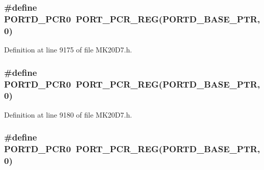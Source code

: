 \subsubsection[{\texorpdfstring{P\+O\+R\+T\+D\+\_\+\+P\+C\+R0}{PORTD_PCR0}}]{\setlength{\rightskip}{0pt plus 5cm}\#define P\+O\+R\+T\+D\+\_\+\+P\+C\+R0~{\bf P\+O\+R\+T\+\_\+\+P\+C\+R\+\_\+\+R\+EG}({\bf P\+O\+R\+T\+D\+\_\+\+B\+A\+S\+E\+\_\+\+P\+TR},0)}\hypertarget{group___p_o_r_t___register___accessor___macros_ga9e25f8f3bd921a0a05ea3ee7a0bf3678}{}\label{group___p_o_r_t___register___accessor___macros_ga9e25f8f3bd921a0a05ea3ee7a0bf3678}


Definition at line 9175 of file M\+K20\+D7.\+h.

\subsubsection[{\texorpdfstring{P\+O\+R\+T\+D\+\_\+\+P\+C\+R0}{PORTD_PCR0}}]{\setlength{\rightskip}{0pt plus 5cm}\#define P\+O\+R\+T\+D\+\_\+\+P\+C\+R0~{\bf P\+O\+R\+T\+\_\+\+P\+C\+R\+\_\+\+R\+EG}({\bf P\+O\+R\+T\+D\+\_\+\+B\+A\+S\+E\+\_\+\+P\+TR},0)}\hypertarget{group___p_o_r_t___register___accessor___macros_ga9e25f8f3bd921a0a05ea3ee7a0bf3678}{}\label{group___p_o_r_t___register___accessor___macros_ga9e25f8f3bd921a0a05ea3ee7a0bf3678}


Definition at line 9180 of file M\+K20\+D7.\+h.

\subsubsection[{\texorpdfstring{P\+O\+R\+T\+D\+\_\+\+P\+C\+R0}{PORTD_PCR0}}]{\setlength{\rightskip}{0pt plus 5cm}\#define P\+O\+R\+T\+D\+\_\+\+P\+C\+R0~{\bf P\+O\+R\+T\+\_\+\+P\+C\+R\+\_\+\+R\+EG}({\bf P\+O\+R\+T\+D\+\_\+\+B\+A\+S\+E\+\_\+\+P\+TR},0)}\hypertarget{group___p_o_r_t___register___accessor___macros_ga9e25f8f3bd921a0a05ea3ee7a0bf3678}{}\label{group___p_o_r_t___register___accessor___macros_ga9e25f8f3bd921a0a05ea3ee7a0bf3678}


